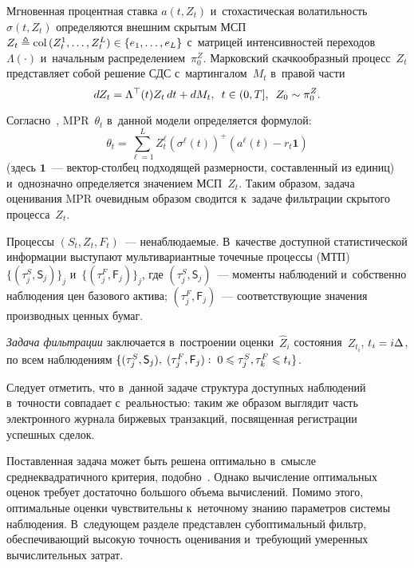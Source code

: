 \begin{multicols}{2}
Мгновенная процентная ставка $a(t,Z_t)$ и~стохастическая волатильность~$\sigma(t,Z_t)$ 
определяются внешним скрытым МСП $Z_t \ebd \mathrm{col}\,(Z_t^1, \ldots, 
Z_t^L) \hm\in \{e_1,\ldots, e_L\}$  с~матрицей интенсивностей переходов~$\Lambda(\cdot)$ 
и~начальным распределением~$\pi_0^Z$. Марковский скачкообразный процесс~$Z_t$ представляет 
собой решение СДС с~мартингалом~$M_t$ в~правой части
\begin{equation}
  dZ_t = \Lambda^{\top}(t)Z_t\,dt + dM_t,\enskip t \in (0,T], \enskip Z_0 \sim 
\pi_0^Z.
  \label{eq:Z_sys}
  \end{equation}



Согласно~\cite{B_23_1_IA}, MPR~$\theta_t$ в~данной модели определяется формулой:
$$
\theta_t = \sum\limits_{\ell=1}^L Z_t^{\ell} \left(\sigma^{\ell}(t)\right)^+ \left( 
a^{\ell}(t) - r_t \mathbf{1} \right)
$$
(здесь $\mathbf{1}$~--- век\-тор-стол\-бец подходящей раз\-мер\-ности, составленный из 
единиц) и~однозначно определяется значением МСП~$Z_t$. Таким образом, задача 
оценивания MPR очевидным образом сводится к~задаче фильтрации скрытого процесса~$Z_t$.

Процессы $(S_t,Z_t,F_t)$~--- ненаблюдаемые. В~качестве доступной статистической 
информации выступают мультивариантные точечные процессы (МТП)~\cite{JSh_10} 
$\{(\tau_j^S,\mathsf{S}_j)\}_j$ и~$\{(\tau_j^F,\mathsf{F}_j)\}_j$, где 
$(\tau_j^S,\mathsf{S}_j)$~--- моменты наблюдений и~собственно наблюдения цен 
базового актива; $(\tau_j^F,\mathsf{F}_j)$~--- соответствующие значения 
производных ценных бумаг.

\textit{Задача фильтрации} заключается в~построении оценки~$\widehat{Z}_i$ 
состояния~$Z_{t_i}$, $t_i \hm= i \Delta$, по всем наблюдениям 
$\{(\tau_j^S,\mathsf{S}_j),\;(\tau_j^F,\mathsf{F}_j): \; 0 \hm\leqslant 
\tau_j^S,\tau_k^F \hm\leqslant t_i\}$.

Следует отметить, что в~данной задаче структура доступных наблюдений в~точности 
совпадает с~реальностью: таким же образом выглядит часть электронного журнала 
биржевых транзакций, посвященная регистрации успешных сделок.

Поставленная задача может быть решена оптимально в~смысле среднеквадратичного 
критерия, подобно~\cite{BMS_15_ARC}. Однако вычисление оптимальных оценок 
требует достаточно большого объема вы\-чис\-ле\-ний. Помимо этого, оптимальные оценки 
чувствительны к~неточному знанию па\-ра\-мет\-ров сис\-те\-мы наблюдения. В~сле\-ду\-ющем 
разделе представлен субоптимальный фильтр, обеспечивающий высокую точ\-ность 
оценивания и~тре\-бу\-ющий умеренных вы\-чис\-ли\-тель\-ных затрат.


\end{multicols}
